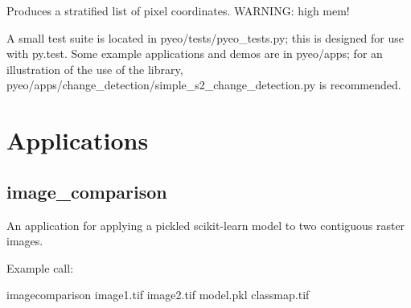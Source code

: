 \documentclass[letterpaper,10pt,english]{sphinxmanual}
\begin{document}

\begin{fulllineitems}
\label{\detokenize{index:pyeo.validation.stratified_random_sample}}
Produces a stratified list of pixel coordinates. WARNING: high mem!

\end{fulllineitems}


A small test suite is located in pyeo/tests/pyeo\_tests.py; this is designed for use with py.test.
Some example applications and demos are in pyeo/apps; for an illustration of the use of the library,
pyeo/apps/change\_detection/simple\_s2\_change\_detection.py is recommended.


\chapter{Applications}
\label{\detokenize{index:module-pyeo.apps.change_detection.image_comparison}}\label{\detokenize{index:applications}}

\section{image\_comparison}
\label{\detokenize{index:image-comparison}}
An application for applying a pickled scikit-learn model to two contiguous raster images.

Example call:

\begin{sphinxVerbatim}[commandchars=\\\{\}]
\PYGZdl{}image\PYGZus{}comparison image\PYGZus{}1.tif image\PYGZus{}2.tif model.pkl class\PYGZus{}map.tif
\end{sphinxVerbatim}
\label{\detokenize{index:module-pyeo.apps.change_detection.rolling_composite_s2_change_detection}}
\end{document}
